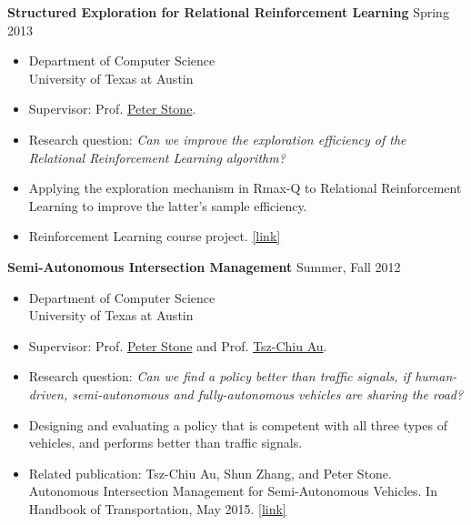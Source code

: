 \documentclass[10pt]{article}
\newenvironment{innerlist}[1][\enskip\textbullet]%
        {\begin{itemize}[#1,leftmargin=*,parsep=0pt,itemsep=0pt,topsep=0pt,partopsep=0pt]}
        {\end{itemize}}
\newcommand\webpage[1]{\href{http://cs.utexas.edu/~menie482/#1}{[link]}}
\begin{document}
\textbf{Structured Exploration for Relational Reinforcement Learning} \hfill
{Spring 2013}
\begin{innerlist}
\item[] Department of Computer Science\\
        University of Texas at Austin
\vspace{.05in}
\item Supervisor: Prof. \href{http://www.cs.utexas.edu/~pstone/}{Peter Stone}.
\item Research question: {\em Can we improve the exploration efficiency of the
Relational Reinforcement Learning algorithm?}
\item Applying the exploration mechanism in Rmax-Q to Relational Reinforcement
Learning to improve the latter's sample efficiency.
\item Reinforcement Learning course project.
\webpage{papers/structuredExploration.pdf}
\end{innerlist}
\vspace{.1in}

\textbf{Semi-Autonomous Intersection Management} \hfill {Summer, Fall 2012}
\begin{innerlist}
\item[] Department of Computer Science\\
        University of Texas at Austin
\vspace{.05in}
\item Supervisor: Prof. \href{http://www.cs.utexas.edu/~pstone/}{Peter Stone}
and Prof. \href{http://cse.unist.ac.kr/~chiu}{Tsz-Chiu Au}.
\item Research question: {\em Can we find a policy better than traffic signals,
if human-driven, semi-autonomous and fully-autonomous vehicles are sharing the
road?}
\item Designing and evaluating a policy that is competent with all three types
of vehicles, and performs better than traffic signals.
\item Related publication: Tsz-Chiu Au, Shun Zhang, and Peter Stone.
Autonomous Intersection Management for Semi-Autonomous Vehicles. In Handbook of
Transportation, May 2015. \webpage{papers/Routledge15-Au.pdf}
\end{innerlist}
\end{document}
